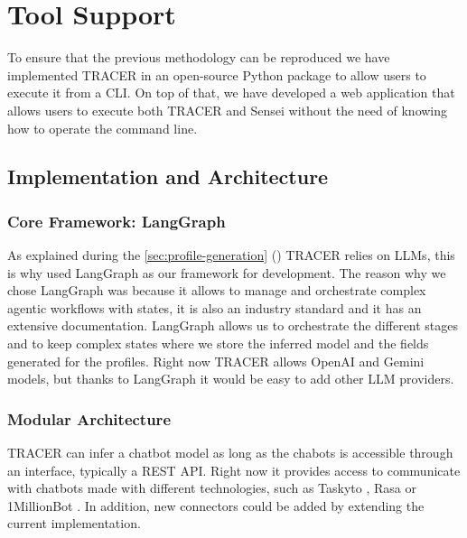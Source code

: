 
\chapter{Tool Support}\label{chapter:tool_support}

To ensure that the previous methodology can be reproduced
we have implemented \acf{TRACER} in an open-source Python package
to allow users to execute it from a \ac{CLI}.
On top of that, we have developed a web application
that allows users to execute both \ac{TRACER} and Sensei
without the need of knowing how to operate the command line.


\section{Implementation and Architecture}

\subsection{Core Framework: LangGraph}

As explained during the \autoref{sec:profile-generation} ()
\ac{TRACER} relies on \acp{LLM},
this is why used LangGraph \autocite{LangGraph} as our framework for development.
The reason why we chose LangGraph
was because it allows to manage and orchestrate
complex agentic workflows with states,
it is also an industry standard and
it has an extensive documentation.
LangGraph allows us to orchestrate the different stages
and to keep complex states where we store
the inferred model and the fields generated for the profiles.
Right now \ac{TRACER} allows OpenAI and Gemini models,
but thanks to LangGraph it would be easy to add other \ac{LLM} providers.

\subsection{Modular Architecture}

\ac{TRACER} can infer a chatbot model as long as
the chabots is accessible through an interface, typically a \acs{REST} \acs{API}.
Right now it provides access to communicate with chatbots made with different technologies,
such as Taskyto \autocite{sanchezcuadradoAutomatingDevelopmentTaskoriented2024}, Rasa \autocite{Rasa2020} or 1MillionBot \autocite{1MillionBot}.
In addition, new connectors could be added by extending the current implementation.

